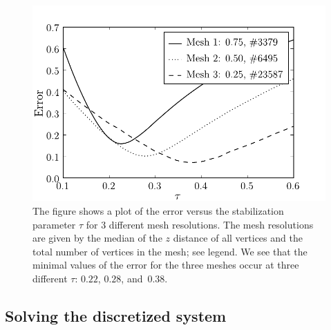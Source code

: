 \begin{figure}
  \center
  \includegraphics[width=\largefig]{chapters/hake/pdf/error_plot}
  \caption[Error plot]{The figure shows a plot of the error versus the
    stabilization parameter $\tau$ for 3 different mesh
    resolutions. The mesh resolutions are given by the median of the
    $z$ distance of all vertices and the total number of vertices in
    the mesh; see legend. We see that the minimal values of the error
    for the three meshes occur at three different $\tau$: $0.22$, $0.28$,
    and~$0.38$.}
  \label{fig:hake:error_plot}
\end{figure}

\subsection{Solving the discretized system}

